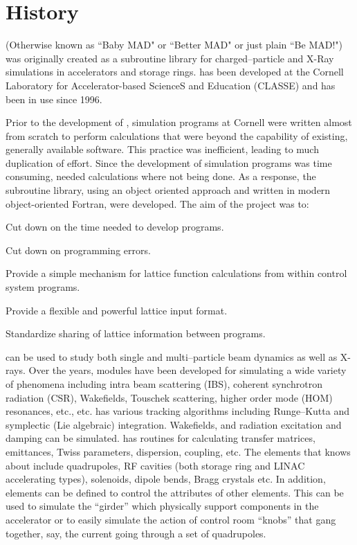 \section{History}

\bmad (Otherwise known as ``Baby MAD" or ``Better MAD" or just plain ``Be MAD!") was originally created as
a subroutine
library for charged--particle and X-Ray simulations in accelerators and storage rings. \bmad has
been developed at the Cornell Laboratory for Accelerator-based ScienceS and Education (CLASSE) and
has been in use since 1996.

Prior to the development of \bmad, simulation programs at Cornell were written almost from scratch
to perform calculations that were beyond the capability of existing, generally available software.
This practice was inefficient, leading to much duplication of effort. Since the development of
simulation programs was time consuming, needed calculations where not being done. As a response, the
\bmad subroutine library, using an object oriented approach and written in modern object-oriented
Fortran, were developed. The aim of the \bmad project was to:
\begin{Itemize}
\item Cut down on the time needed to develop programs.
\item Cut down on programming errors.
\item Provide a simple mechanism for lattice function calculations
from within control system programs.
\item Provide a flexible and powerful lattice input format.
\item Standardize sharing of lattice information between 
programs.
\end{Itemize}

\bmad can be used to study both single and multi--particle beam dynamics as well as X-rays.  Over
the years, \bmad modules have been developed for simulating a wide variety of phenomena including
intra beam scattering (IBS), coherent synchrotron radiation (CSR), Wakefields, Touschek scattering,
higher order mode (HOM) resonances, etc., etc.  \bmad has various tracking algorithms including
Runge--Kutta and symplectic (Lie algebraic) integration. Wakefields, and radiation excitation and
damping can be simulated. \bmad has routines for calculating transfer matrices, emittances, Twiss
parameters, dispersion, coupling, etc. The elements that \bmad knows about include quadrupoles, RF
cavities (both storage ring and LINAC accelerating types), solenoids, dipole bends, Bragg crystals
etc.  In addition, elements can be defined to control the attributes of other elements. This can be
used to simulate the ``girder'' which physically support components in the accelerator or to easily
simulate the action of control room ``knobs'' that gang together, say, the current going through a
set of quadrupoles.

